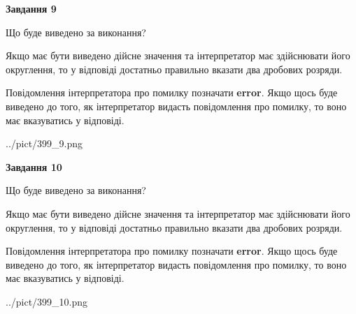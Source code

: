\documentclass[12pt, ukrainian]{article}
\begin{document}
{\begin {Large}
{\begin {center}\textbf{Завдання 9}\end {center}}\par
Що буде виведено за виконання? \par

Якщо має бути виведено дійсне значення та інтерпретатор має здійснювати його округлення, 
то у відповіді достатньо правильно вказати два дробових розряди.

Повідомлення інтерпретатора про помилку позначати \textbf{error}.
Якщо щось буде виведено до того, як інтерпретатор видасть повідомлення про помилку, 
то воно має вказуватись у відповіді. \par

\begin{center}
	{../pict/399_9.png}
\end{center}
\newpage

{\begin {center}\textbf{Завдання 10}\end {center}}\par
Що буде виведено за виконання? \par

Якщо має бути виведено дійсне значення та інтерпретатор має здійснювати його округлення, 
то у відповіді достатньо правильно вказати два дробових розряди.

Повідомлення інтерпретатора про помилку позначати \textbf{error}.
Якщо щось буде виведено до того, як інтерпретатор видасть повідомлення про помилку, 
то воно має вказуватись у відповіді. \par

\begin{center}
	{../pict/399_10.png}
\end{center}
\newpage

\end {Large}}
\end{document}
